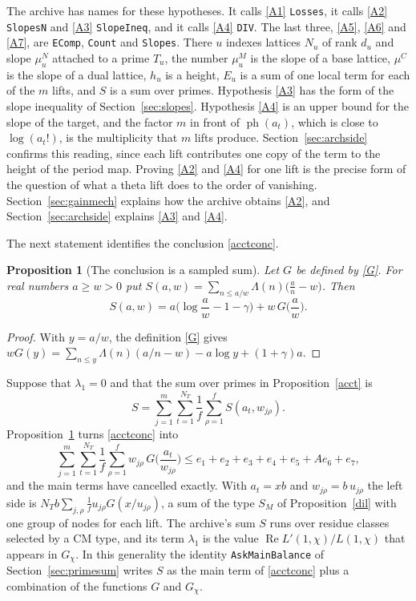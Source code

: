\documentclass[11pt,letterpaper]{article}
\newtheorem{proposition}[theorem]{Proposition}
\numberwithin{equation}{section}
\begin{document}
The archive has names for these hypotheses. It calls \eqref{A1} \texttt{Losses}, it calls \eqref{A2} \texttt{SlopesN} and \eqref{A3} \texttt{SlopeIneq}, and it calls \eqref{A4} \texttt{DIV}. The last three, \eqref{A5}, \eqref{A6} and \eqref{A7}, are \texttt{EComp}, \texttt{Count} and \texttt{Slopes}. There $u$ indexes lattices $N_u$ of rank $d_u$ and slope $\mu^N_u$ attached to a prime $T_u$, the number $\mu^M_u$ is the slope of a base lattice, $\mu^C$ is the slope of a dual lattice, $h_u$ is a height, $E_u$ is a sum of one local term for each of the $m$ lifts, and $S$ is a sum over primes. Hypothesis \eqref{A3} has the form of the slope inequality of Section~\ref{sec:slopes}. Hypothesis \eqref{A4} is an upper bound for the slope of the target, and the factor $m$ in front of $\operatorname{ph}(a_t)$, which is close to $\log(a_t!)$, is the multiplicity that $m$ lifts produce. Section~\ref{sec:archside} confirms this reading, since each lift contributes one copy of the term to the height of the period map. Proving \eqref{A2} and \eqref{A4} for one lift is the precise form of the question of what a theta lift does to the order of vanishing. Section~\ref{sec:gainmech} explains how the archive obtains \eqref{A2}, and Section~\ref{sec:archside} explains \eqref{A3} and \eqref{A4}.

The next statement identifies the conclusion \eqref{acctconc}.

\begin{proposition}[The conclusion is a sampled sum]\label{sampid}
Let $G$ be defined by \eqref{G}. For real numbers $a\ge w>0$ put $S(a,w)=\sum_{n\le a/w}\Lambda(n)\big(\frac an-w\big)$. Then
\[
S(a,w)=a\Big(\log\frac aw-1-\gamma\Big)+w\,G\Big(\frac aw\Big).
\]
\end{proposition}
\begin{proof}
With $y=a/w$, the definition \eqref{G} gives $wG(y)=\sum_{n\le y}\Lambda(n)(a/n-w)-a\log y+(1+\gamma)a$.
\end{proof}

Suppose that $\lambda_1=0$ and that the sum over primes in Proposition~\ref{acct} is
\[
S=\sum_{j=1}^m\sum_{t=1}^{N_T}\frac1f\sum_{\rho=1}^fS(a_t,w_{j\rho}).
\]
Proposition~\ref{sampid} turns \eqref{acctconc} into
\begin{equation}\label{sampled}
\sum_{j=1}^m\sum_{t=1}^{N_T}\frac1f\sum_{\rho=1}^fw_{j\rho}\,G\Big(\frac{a_t}{w_{j\rho}}\Big)\le e_1+e_2+e_3+e_4+e_5+Ae_6+e_7 ,
\end{equation}
and the main terms have cancelled exactly. With $a_t=xb$ and $w_{j\rho}=b\,u_{j\rho}$ the left side is $N_Tb\sum_{j,\rho}\frac1fu_{j\rho}G(x/u_{j\rho})$, a sum of the type $S_M$ of Proposition~\ref{dil} with one group of nodes for each lift. The archive's sum $S$ runs over residue classes selected by a CM type, and its term $\lambda_1$ is the value $\operatorname{Re}L'(1,\chi)/L(1,\chi)$ that appears in $G_\chi$. In this generality the identity \texttt{AskMainBalance} of Section~\ref{sec:primesum} writes $S$ as the main term of \eqref{acctconc} plus a combination of the functions $G$ and $G_\chi$.
\end{document}

